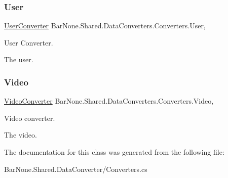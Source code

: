 \subsubsection{\texorpdfstring{User}{User}}
{\footnotesize\ttfamily \mbox{\hyperlink{class_bar_none_1_1_shared_1_1_data_converters_1_1_user_converter}{User\+Converter}} Bar\+None.\+Shared.\+Data\+Converters.\+Converters.\+User\hspace{0.3cm}{\ttfamily [get]}, {}}



User Converter. 

The user. \mbox{\label{class_bar_none_1_1_shared_1_1_data_converters_1_1_converters_a1d18eff598959b2b968850cc30284014}} 
\subsubsection{\texorpdfstring{Video}{Video}}
{\footnotesize\ttfamily \mbox{\hyperlink{class_bar_none_1_1_shared_1_1_data_converter_1_1_lift_1_1_video_converter}{Video\+Converter}} Bar\+None.\+Shared.\+Data\+Converters.\+Converters.\+Video\hspace{0.3cm}{\ttfamily [get]}, {}}



Video converter. 

The video. 

The documentation for this class was generated from the following file\+:\begin{DoxyCompactItemize}
\item 
Bar\+None.\+Shared.\+Data\+Converter/Converters.\+cs\end{DoxyCompactItemize}
